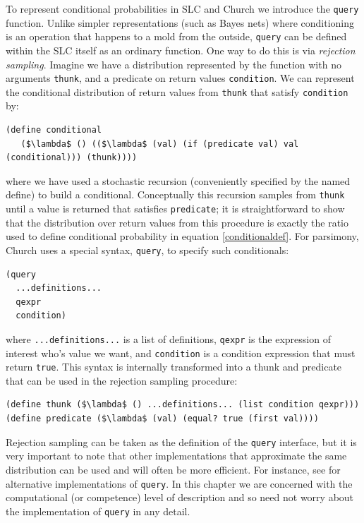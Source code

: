 \documentclass[pdfextras]{handbook}
\begin{document}
To represent conditional probabilities in SLC and Church we introduce the \lstinline{query} function. Unlike simpler representations (such as Bayes nets) where conditioning is an operation that happens to a mold from the outside, \lstinline{query} can be defined within the SLC itself as an ordinary function. One way to do this is via \emph{rejection sampling}. Imagine we have a distribution represented by the function with no arguments \lstinline{thunk}, and a predicate on return values \lstinline{condition}. We can represent the conditional distribution of return values from \lstinline{thunk} that satisfy \lstinline{condition} by:
\begin{lstlisting}[mathescape]
(define conditional 
   ($\lambda$ () (($\lambda$ (val) (if (predicate val) val (conditional))) (thunk))))
\end{lstlisting}
where we have used a stochastic recursion (conveniently specified by the named define) to build a conditional. 
Conceptually this recursion samples from \lstinline{thunk} until a value is returned that satisfies \lstinline{predicate}; it is straightforward to show that the distribution over return values from this procedure is exactly the ratio used to define conditional probability in equation \ref{conditionaldef}.
For parsimony, Church uses a special syntax, \lstinline{query}, to specify such conditionals: 
\begin{lstlisting}[mathescape]
(query
  ...definitions...
  qexpr
  condition)
\end{lstlisting}
where \lstinline{...definitions...} is a list of definitions, \lstinline{qexpr} is the expression of interest who's value we want, and \lstinline{condition} is a condition expression that must return \lstinline{true}. 
This syntax is internally transformed into a thunk and predicate that can be used in the rejection sampling procedure:
\begin{lstlisting}[mathescape]
(define thunk ($\lambda$ () ...definitions... (list condition qexpr)))
(define predicate ($\lambda$ (val) (equal? true (first val))))
\end{lstlisting}
Rejection sampling can be taken as the definition of the \lstinline{query} interface, but it is very important to note that other implementations that approximate the same distribution can be used and will often be more efficient. For instance, see \cite{wingate,etc} for alternative implementations of \lstinline{query}. In this chapter we are concerned with the computational (or competence) level of description and so need not worry about the implementation of \lstinline{query} in any detail.
\end{document}
